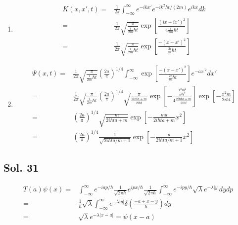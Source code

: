 \begin{enumerate}
    \item 
    \begin{align*}
        K(x,x',t)=&
        \frac{1}{2\pi}
        \int_{-\infty}^{\infty} 
        e^{-ikx'}
        e^{-ik^2\hbar t/(2m)}e^{ikx}dk\\
        =&
        \frac{1}{2\pi}
        \sqrt{\frac{\pi}{\frac{i}{2m}\hbar t}}
        \exp\left[
        \frac{(ix-ix')^2}{4\frac{i}{2m}\hbar t}
        \right]\\
        =&
        \frac{1}{2\pi}
        \sqrt{\frac{\pi}{\frac{i}{2m}\hbar t}}
        \exp\left[
        \frac{-(x-x')^2}{\frac{2i}{m}\hbar t}
        \right]
    \end{align*}
    \item 
    \begin{align*}
        \Psi(x,t)
        =&
        \frac{1}{2\pi}
        \sqrt{\frac{\pi}{\frac{i}{2m}\hbar t}}
        \left(
        \frac{2a}{\pi}
        \right)^{1/4}
        \int_{-\infty}^{\infty}
        \exp\left[
        \frac{-(x-x')^2}{\frac{2i}{m}\hbar t}
        \right]
        e^{-ax^{'2}}
        dx'\\
        =&
        \frac{1}{2\pi}
        \sqrt{\frac{\pi}{\frac{i}{2m}\hbar t}}
        \left(
        \frac{2a}{\pi}
        \right)^{1/4}
        \sqrt{\frac{\pi}{\frac{2i\hbar ta+m}{2i\hbar t}}}
        \exp\left[-
        \frac{\frac{x^2m^2}{\hbar^2t^2}}
        {4\frac{2i\hbar ta+m}{2i\hbar t}}
        \right]
        \exp\left[
        -\frac{x^2m}{2i\hbar t}
        \right]\\
        =&
        \left(\frac{2a}{\pi}\right)^{1/4}
        \sqrt{\frac{m}{2i\hbar ta+m}}
        \exp\left[-
        \frac{ma}{2i\hbar ta+m}x^2
        \right]\\
        =&
        \left(\frac{2a}{\pi}\right)^{1/4}
        \frac{1}{\sqrt{2i\hbar ta/m+1}}
        \exp\left[-
        \frac{a}{2i\hbar ta/m+1}x^2
        \right]
    \end{align*}
    
\end{enumerate}

\subsection*{Sol. 31}
\begin{align*}
    T(a)\psi(x)
    =&\int_{-\infty}^{\infty}
    e^{-iap/\hbar}
    \frac{1}{\sqrt{2\pi\hbar}}e^{ipx/\hbar}
    \frac{1}{\sqrt{2\pi\hbar}}
    \int_{-\infty}^{\infty}
    e^{-ipy/\hbar}
    \sqrt{\lambda}e^{-\lambda|y|}dydp\\
    =&
    \frac{1}{\hbar}\sqrt{\lambda}
    \int_{-\infty}^{\infty}e^{-\lambda|y|}\delta(\frac{-a+x-y}{\hbar})dy\\
    =&\sqrt{\lambda}e^{-\lambda|x-a|} = \psi(x-a)
\end{align*}

